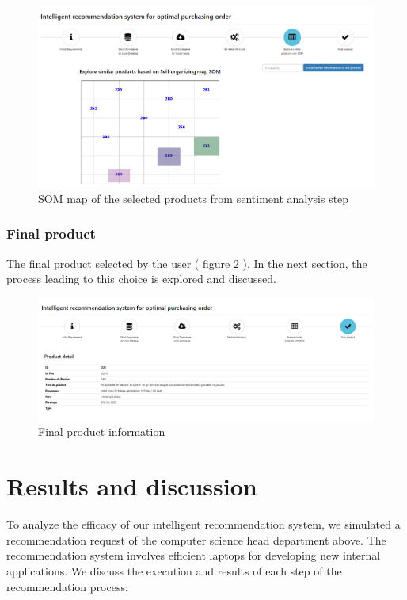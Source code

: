 \documentclass[preprint,3p,onecolumn]{elsarticle}
\begin{document}
\begin{figure}[H]
\centering
\includegraphics[scale=.3]{05_SOM}
\caption{ SOM map of the selected products from sentiment analysis step}
\label{05_SOM}
\end{figure}


\subsubsection{Final product}

\par The final product selected by the user ( figure \ref{06_Final_product} ). In the next section, the process leading to this choice is explored and discussed.

\begin{figure}[H]
\centering
\includegraphics[scale=.3]{06_Final_product}
\caption{Final product information}
\label{06_Final_product}
\end{figure}

\section{Results and discussion}

\par To analyze the efficacy of our intelligent recommendation system, we simulated a recommendation request of the computer science head department above. The recommendation system involves efficient laptops for developing new internal applications. We discuss the execution and results of each step of the recommendation process:
\end{document}
